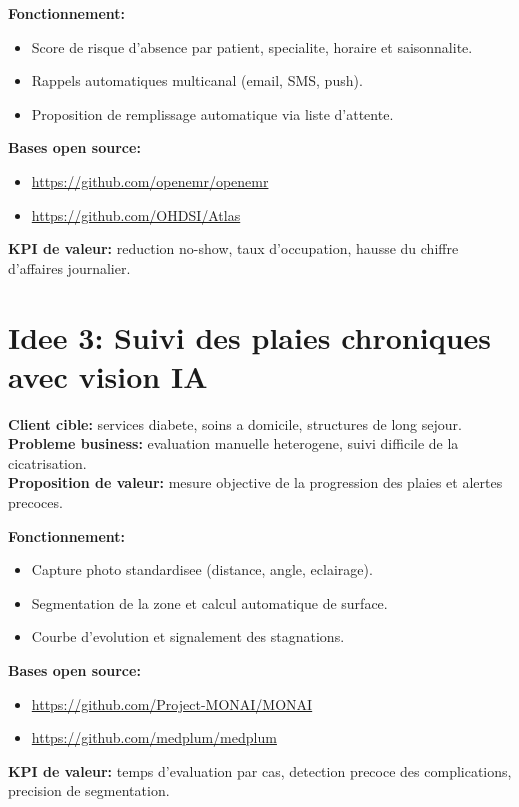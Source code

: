 \documentclass[11pt,a4paper]{article}
\begin{document}
\textbf{Fonctionnement:}
\begin{itemize}[leftmargin=*]
  \item Score de risque d'absence par patient, specialite, horaire et saisonnalite.
  \item Rappels automatiques multicanal (email, SMS, push).
  \item Proposition de remplissage automatique via liste d'attente.
\end{itemize}

\textbf{Bases open source:}
\begin{itemize}[leftmargin=*]
  \item \url{https://github.com/openemr/openemr}
  \item \url{https://github.com/OHDSI/Atlas}
\end{itemize}

\textbf{KPI de valeur:} reduction no-show, taux d'occupation, hausse du chiffre d'affaires journalier.

\section*{Idee 3: Suivi des plaies chroniques avec vision IA}
\textbf{Client cible:} services diabete, soins a domicile, structures de long sejour.\\
\textbf{Probleme business:} evaluation manuelle heterogene, suivi difficile de la cicatrisation.\\
\textbf{Proposition de valeur:} mesure objective de la progression des plaies et alertes precoces.

\textbf{Fonctionnement:}
\begin{itemize}[leftmargin=*]
  \item Capture photo standardisee (distance, angle, eclairage).
  \item Segmentation de la zone et calcul automatique de surface.
  \item Courbe d'evolution et signalement des stagnations.
\end{itemize}

\textbf{Bases open source:}
\begin{itemize}[leftmargin=*]
  \item \url{https://github.com/Project-MONAI/MONAI}
  \item \url{https://github.com/medplum/medplum}
\end{itemize}

\textbf{KPI de valeur:} temps d'evaluation par cas, detection precoce des complications, precision de segmentation.
\end{document}
